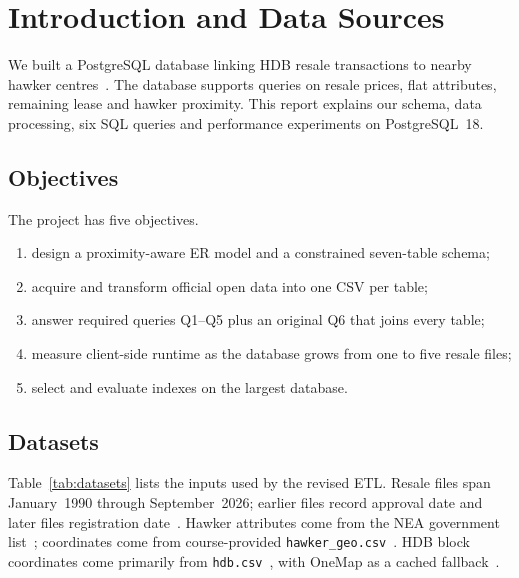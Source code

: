 \section{Introduction and Data Sources}

We built a PostgreSQL database linking HDB resale transactions to nearby hawker centres~\cite{datagovHDB,datagovHawker}.
The database supports queries on resale prices, flat attributes, remaining lease and hawker proximity.
This report explains our schema, data processing, six SQL queries and performance experiments on PostgreSQL~18.

\subsection{Objectives}
The project has five objectives.
\begin{enumerate}
  \item design a proximity-aware ER model and a constrained seven-table schema;
  \item acquire and transform official open data into one CSV per table;
  \item answer required queries Q1--Q5 plus an original Q6 that joins every table;
  \item measure client-side runtime as the database grows from one to five resale files;
  \item select and evaluate indexes on the largest database.
\end{enumerate}

\subsection{Datasets}
Table~\ref{tab:datasets} lists the inputs used by the revised ETL.
Resale files span January~1990 through September~2026; earlier files record approval date and later files registration date~\cite{datagovHDB}.
Hawker attributes come from the NEA government list~\cite{datagovHawker}; coordinates come from course-provided \texttt{hawker\_geo.csv}~\cite{hawkerGeo}.
HDB block coordinates come primarily from \texttt{hdb.csv}~\cite{siteselectHDB}, with OneMap as a cached fallback~\cite{onemap}.

